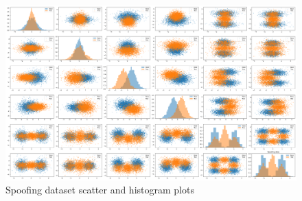 \begin{figure}[htbp]
    \centering
    \includegraphics[width=0.9\linewidth]{lab02/original_data_scatter_matrix.png    } %
    \caption{Spoofing dataset scatter and histogram plots}
    \label{fig:original_scatter}
\end{figure}
